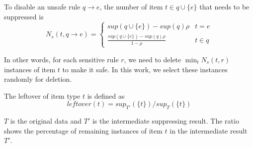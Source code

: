\begin{definition}
\label{minimum}
To disable an unsafe rule $q \rightarrow e$, the number of item %
$t \in q\cup\{e\}$ that needs to be suppressed is
\[N_s(t, q\rightarrow e)=
\begin{cases}
sup(q\cup \{e\})-sup(q)\rho & t=e  \\
\frac{sup(q\cup \{e\})-sup(q)\rho}{1-\rho} & t\in q %
\end{cases} \]
\end{definition}

In other words, for each sensitive rule $r$,
we need to delete $\min_t N_s(t, r)$ instances of item $t$ to make it safe.
In this work, we select these instances randomly for deletion.

\begin{definition}
 The leftover of item type $t$ is defined as
\[ leftover(t)={sup_{T'}(\{t\})}/{sup_T(\{t\})} \]
\end{definition}
$T$ is the original data and $T'$ is the intermediate suppressing result.
The ratio shows the percentage of remaining instances of item $t$
in the intermediate result $T'$.


